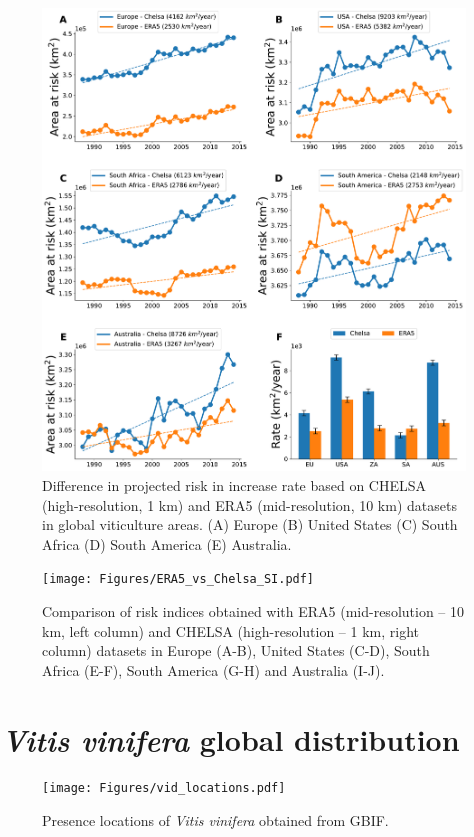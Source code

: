 \begin{figure}[H]
    \centering
    \includegraphics[width=1\textwidth]{Figures/area_risk.pdf}
    \caption{Difference in projected risk in increase rate based on CHELSA
        (high-resolution, 1 km) and ERA5 (mid-resolution, 10 km) datasets in
        global
        viticulture areas. (A) Europe (B) United States (C) South Africa (D)
        South
        America (E) Australia.}
    \label{fig:area_at_risk}
\end{figure}

\begin{figure}[H]
    \centering
    \texttt{[image: Figures/ERA5\_vs\_Chelsa\_SI.pdf]}
    \caption{Comparison of risk indices obtained with ERA5 (mid-resolution
        -- 10 km, left column) and CHELSA (high-resolution -- 1 km, right
        column)
        datasets in Europe (A-B), United States (C-D), South Africa (E-F),
        South
        America (G-H) and Australia (I-J).}
    \label{fig:ERA5_vs_chelsa}
\end{figure}

\section{\textit{Vitis vinifera} global distribution}

\begin{figure}[H]
    \centering
    \texttt{[image: Figures/vid\_locations.pdf]}
    \caption{Presence locations of \textit{Vitis vinifera} obtained from
        GBIF.}
    \label{fig:vid_locations}
\end{figure}
